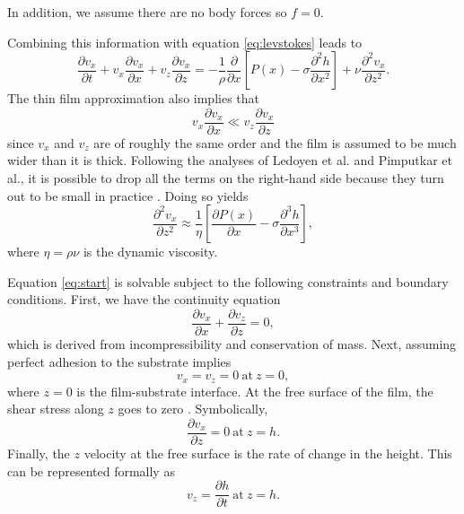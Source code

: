 \documentclass[aps, prl, twocolumn, groupedaddress]{revtex4-1}
\begin{document}
In addition, we assume there are no body forces so $f=0$.

Combining this information with equation \ref{eq:levstokes} leads to
\begin{equation}
  \frac{\partial v_x}{\partial t}+v_x\frac{\partial v_x}{\partial x} +v_z\frac{\partial
 v_x}{\partial z} = - \frac{1}{\rho}\frac{\partial}{\partial
 x}\left[P(x)-\sigma\frac{\partial^2 h}{\partial
   x^2}\right]+\nu\frac{\partial^2 v_x}{\partial z^2} \mathrm{.} 
\label{eq:lastfluid}
\end{equation}
The thin film approximation also implies that
\begin{equation}
v_x\frac{\partial v_x}{\partial x} \ll v_z\frac{\partial v_x}{\partial z}
\end{equation}
since $v_x$ and $v_z$ are of roughly the same order and the film is
assumed to be much wider than it is thick. Following the
analyses of Ledoyen et al. and Pimputkar et al., it is possible to
drop all the terms on the right-hand side because they turn out to be
small in practice \cite{ledoyen, pimputkar, barrett}. Doing so yields
\begin{equation}
\frac{\partial^2 v_x}{\partial z^2} \approx \frac{1}{\eta}\left[\frac{\partial
P(x)}{\partial x}-\sigma\frac{\partial^3 h}{\partial x^3}\right] \mathrm{,}
\label{eq:start}
\end{equation}
where $\eta= \rho\nu$ is the dynamic viscosity.

Equation \ref{eq:start} is solvable subject to the following
constraints and boundary conditions. First, we have the continuity
equation
\begin{equation}
\frac{\partial v_x}{\partial x}+\frac{\partial v_z}{\partial z} =0 \mathrm{,}
\label{eq:continuity}
\end{equation}
which is derived from incompressibility and conservation of
mass. Next, assuming perfect adhesion to the substrate implies
\begin{equation}
v_x=v_z=0 \mathrm{\ at\ } z=0 \mathrm{,} \label{eq:substrate}
\end{equation}
where $z=0$ is the film-substrate interface. At the free surface of
the film, the shear stress along $z$ goes to zero \cite{levich,
barrett}. Symbolically,
\begin{equation}
\frac{\partial v_x}{\partial z}=0 \mathrm{\ at\ } z=h \mathrm{.} \label{eq:shear}
\end{equation}
Finally, the $z$ velocity at the free surface is the rate of change in
the height. This can be represented formally as
\begin{equation}
v_z=\frac{\partial h}{\partial t} \mathrm{\ at\ } z=h \mathrm{.} \label{eq:vzbound}
\end{equation}
\end{document}
